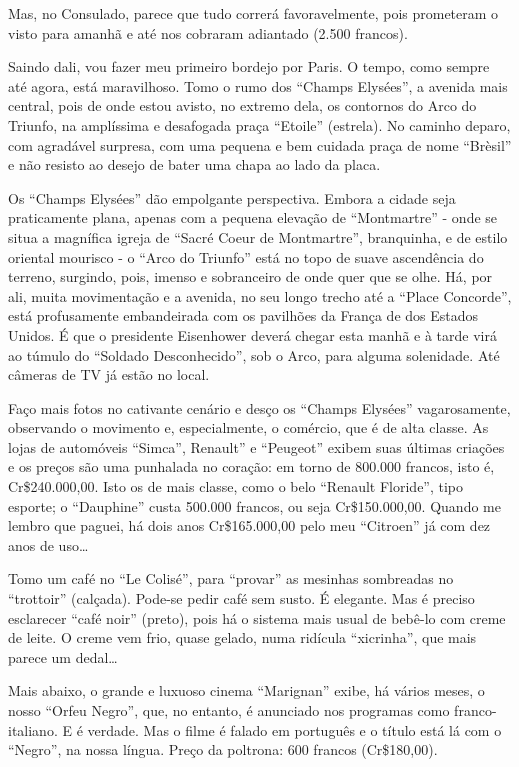 Mas, no Consulado, parece que tudo correrá favoravelmente, pois prometeram o visto para amanhã e até nos cobraram adiantado (2.500 francos).

Saindo dali, vou fazer meu primeiro bordejo por Paris. O tempo, como sempre até agora, está maravilhoso. Tomo o rumo dos “Champs Elysées”, a avenida mais central, pois de onde estou avisto, no extremo dela, os contornos do Arco do Triunfo, na amplíssima e desafogada praça “Etoile” (estrela). No caminho deparo, com agradável surpresa, com uma pequena e bem cuidada praça de nome “Brèsil” e não resisto ao desejo de bater uma chapa ao lado da placa.

Os “Champs Elysées” dão empolgante perspectiva. Embora a cidade seja praticamente plana, apenas com a pequena elevação de “Montmartre” - onde se situa a magnífica igreja de “Sacré Coeur de Montmartre”, branquinha, e de estilo oriental mourisco - o “Arco do Triunfo” está no topo de suave ascendência do terreno, surgindo, pois, imenso e sobranceiro de onde quer que se olhe. Há, por ali, muita movimentação e a avenida, no seu longo trecho até a “Place Concorde”, está profusamente embandeirada com os pavilhões da França de dos Estados Unidos. É que o presidente Eisenhower deverá chegar esta manhã e à tarde virá ao túmulo do “Soldado Desconhecido”, sob o Arco, para alguma solenidade. Até câmeras de TV já estão no local.

Faço mais fotos no cativante cenário e desço os “Champs Elysées” vagarosamente, observando o movimento e, especialmente, o comércio, que é de alta classe. As lojas de automóveis “Simca”, Renault” e “Peugeot” exibem suas últimas criações e os preços são uma punhalada no coração: em torno de 800.000 francos, isto é, Cr\$240.000,00. Isto os de mais classe, como o belo “Renault Floride”, tipo esporte; o “Dauphine” custa 500.000 francos, ou seja Cr\$150.000,00. Quando me lembro que paguei, há dois anos Cr\$165.000,00 pelo meu “Citroen” já com dez anos de uso\ldots

Tomo um café no “Le Colisé”, para “provar” as mesinhas sombreadas no “trottoir” (calçada). Pode-se pedir café sem susto. É elegante. Mas é preciso esclarecer “café noir” (preto), pois há o sistema mais usual de bebê-lo com creme de leite. O creme vem frio, quase gelado, numa ridícula “xicrinha”, que mais parece um dedal\ldots

Mais abaixo, o grande e luxuoso cinema “Marignan” exibe, há vários meses, o nosso “Orfeu Negro”, que, no entanto, é anunciado nos programas como franco-italiano. E é verdade. Mas o filme é falado em português e o título está lá com o “Negro”, na nossa língua. Preço da poltrona: 600 francos (Cr\$180,00).

